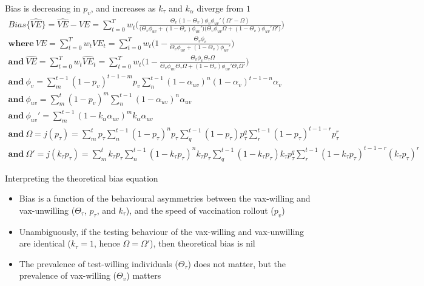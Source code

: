 \documentclass[aspectratio=169]{beamer}
\begin{document}
\begin{frame}{Bias is decreasing in $p_v$, and increases as $k_{\tau}$ and $k_{\alpha}$ diverge from $1$}
	\tiny
	\begin{eqnarray}
		{Bias}\{\widehat{VE}\} = \widehat{VE} - VE = \sum_{t=0}^{T} w_{t} \bigg( \frac{\Theta_{v} ( 1 - \Theta_{v} ) \phi_v \phi_{uv}' ( \Omega' - \Omega ) }{\big( \Theta_{v} \phi_{uv} + (1 - \Theta_{v}) \phi_{uv}'  \big) \big( \Theta_{v} \phi_{uv} \Omega + ( 1 - \Theta_{v}) \phi_{uv}' \Omega' \big)} \bigg) \\ 
		\textbf{where} \ VE = \sum_{t=0}^{T} w_{t} VE_{t} = \sum_{t=0}^{T} w_{t} \Big( 1 - \frac{\Theta_{v}\phi_v}{\Theta_{v} \phi_{uv} + (1 - \Theta_{v}) \phi_{uv}' } \Big) \\
		\textbf{and} \ \widehat{VE} = \sum_{t=0}^{T} w_{t} \widehat{VE}_{t} = \sum_{t=0}^{T} w_{t} \Big( 1 - \frac{\Theta_{v}\phi_v\Theta_{\tau}\Omega }{\Theta_{v} \phi_{uv}\Theta_{\tau}\Omega + (1 - \Theta_{v}) \phi_{uv}'\Theta_{\tau}\Omega' } \Big) \\ 
		\textbf{and} \ \phi_v = \sum_{m}^{t-1} (1-p_v)^{t-1-m} p_v \sum_{n}^{t-1}(1-\alpha_{uv})^{n}(1-\alpha_{v})^{t-1-n}\alpha_{v} \\
		\textbf{and} \ \phi_{uv} = \sum_{m}^{t} (1-p_v)^{m} \sum_{n}^{t-1} (1-\alpha_{uv})^{n}\alpha_{uv} \\
		\textbf{and} \ \phi_{uv}' = \sum_{m}^{t-1} (1- k_\alpha \alpha_{uv})^{m} k_\alpha \alpha_{uv} \\
		\textbf{and} \ \Omega = j(p_\tau) = \sum_{m}^{t} p_{\tau} \sum_{n}^{t-1} (1-p_{\tau})^{n}p_{\tau} \sum_{q}^{t-1} (1-p_{\tau})p_{\tau}^{q} \sum_{r}^{t-1} (1-p_{\tau})^{t-1-r} p_{\tau}^{r} \\ 
		\textbf{and} \ \Omega' = j(k_\tau p_\tau) = \sum_{m}^{t} k_{\tau} p_{\tau} \sum_{n}^{t-1} (1- k_{\tau} p_{\tau})^{n} k_{\tau} p_{\tau} \sum_{q}^{t-1} (1- k_{\tau} p_{\tau}) k_{\tau} p_{\tau}^{q} \sum_{r}^{t-1} (1- k_{\tau} p_{\tau})^{t-1-r} (k_{\tau} p_{\tau})^{r}
	\end{eqnarray}
\end{frame}

\begin{frame}{Interpreting the theoretical bias equation}
	\begin{itemize}
		\item Bias is a function of the behavioural asymmetries between the vax-willing and vax-unwilling ($\Theta_{\tau}$, $p_\tau$, and $k_\tau$), and the speed of vaccination rollout ($p_v$)
		\item Unambiguously, if the testing behaviour of the vax-willing and vax-unwilling are identical ($k_\tau = 1$, hence $\Omega = \Omega'$), then theoretical bias is nil
		\item The prevalence of test-willing individuals ($\Theta_{\tau}$) does not matter, but the prevalence of vax-willing ($\Theta_{v}$) matters
	\end{itemize}
\end{frame}
\end{document}

